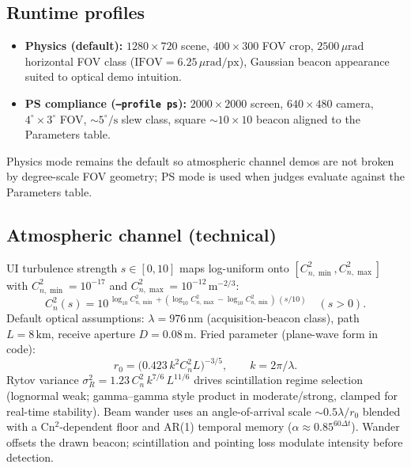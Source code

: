 \documentclass[11pt,a4paper]{article}
\begin{document}
\subsection{Runtime profiles}
\label{sec:profiles}
\begin{itemize}
  \item \textbf{Physics (default):} $1280\times720$ scene, $400\times300$ FOV crop, $2500\,\mu\mathrm{rad}$ horizontal FOV class ($\mathrm{IFOV}=6.25\,\mu\mathrm{rad/px}$), Gaussian beacon appearance suited to optical demo intuition.
  \item \textbf{PS compliance (\texttt{--profile ps}):} $2000\times2000$ screen, $640\times480$ camera, $4^\circ\times3^\circ$ FOV, $\sim5^\circ/\mathrm{s}$ slew class, square $\sim10\times10$ beacon aligned to the Parameters table.
\end{itemize}
Physics mode remains the default so atmospheric channel demos are not broken by degree-scale FOV geometry; PS mode is used when judges evaluate against the Parameters table.

\subsection{Atmospheric channel (technical)}
UI turbulence strength $s\in[0,10]$ maps log-uniform onto $[C_{n,\min}^2,C_{n,\max}^2]$ with
$C_{n,\min}^2=10^{-17}$ and $C_{n,\max}^2=10^{-12}\,\mathrm{m}^{-2/3}$:
\begin{equation}
C_n^2(s)
=
10^{\,\log_{10} C_{n,\min}^2
+ (\log_{10} C_{n,\max}^2-\log_{10} C_{n,\min}^2)\,(s/10)}
\quad (s>0).
\end{equation}
Default optical assumptions: $\lambda=976\,\mathrm{nm}$ (acquisition-beacon class), path $L=8\,\mathrm{km}$, receive aperture $D=0.08\,\mathrm{m}$.
Fried parameter (plane-wave form in code):
\begin{equation}
r_0 = \bigl(0.423\, k^2 C_n^2 L\bigr)^{-3/5},\qquad k=2\pi/\lambda.
\end{equation}
Rytov variance $\sigma_R^2 = 1.23\, C_n^2\, k^{7/6}\, L^{11/6}$ drives scintillation regime selection (lognormal weak; gamma--gamma style product in moderate/strong, clamped for real-time stability).
Beam wander uses an angle-of-arrival scale $\sim 0.5\lambda/r_0$ blended with a Cn$^2$-dependent floor and AR(1) temporal memory ($\alpha\approx 0.85^{60\Delta t}$).
Wander offsets the drawn beacon; scintillation and pointing loss modulate intensity before detection.
\end{document}
